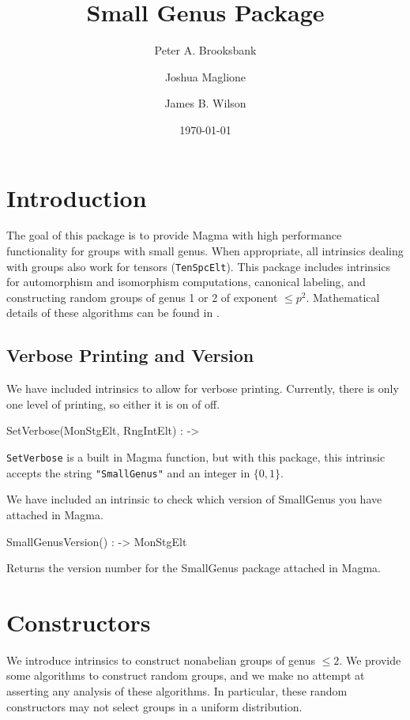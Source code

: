 \documentclass{documentation}
\title{Small Genus Package}
\author{Peter A. Brooksbank}
\author{Joshua Maglione}
\author{James B. Wilson}
\date{\today}
\begin{document}
\frontmatter

\maketitle
\tableofcontents

\mainmatter

\chapter{Introduction}

The goal of this package is to provide {\sc Magma} \cite{Magma} with high performance functionality for groups with small genus. 
When appropriate, all intrinsics dealing with groups also work for tensors ({\tt TenSpcElt}). 
This package includes intrinsics for automorphism and isomorphism computations, canonical labeling, and constructing random groups of genus 1 or 2 of exponent  $\leq p^2$. 
Mathematical details of these algorithms can be found in \cite{BMW}.

\section{Verbose Printing and Version}

We have included intrinsics to allow for verbose printing. 
Currently, there is only one level of printing, so either it is on of off. 

\begin{intrinsics}
SetVerbose(MonStgElt, RngIntElt) : -> 
\end{intrinsics}

{\tt SetVerbose} is a built in Magma function, but with this package, this intrinsic accepts the string {\tt "SmallGenus"} and an integer in $\{0,1\}$. 

We have included an intrinsic to check which version of SmallGenus you have attached in Magma.

\begin{intrinsics}
SmallGenusVersion() : -> MonStgElt
\end{intrinsics}

Returns the version number for the SmallGenus package attached in Magma.


\chapter{Constructors}

We introduce intrinsics to construct nonabelian groups of genus $\leq 2$. 
We provide some algorithms to construct random groups, and we make no attempt at asserting any analysis of these algorithms.
In particular, these random constructors may not select groups in a uniform distribution. 
\end{document}
